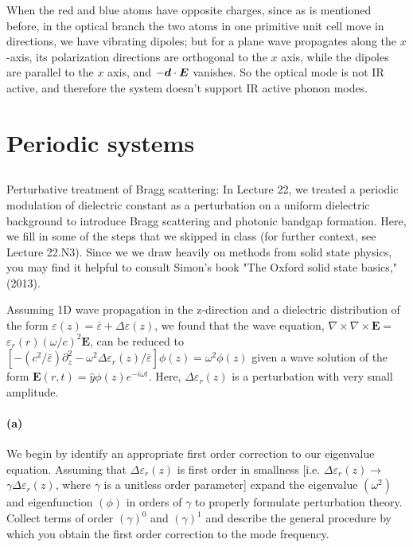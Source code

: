 \documentclass[hyperref, a4paper]{article}
\begin{document}
When the red and blue atoms have opposite charges, 
since as is mentioned before, 
in the optical branch the two atoms in one primitive unit cell move in directions, 
we have vibrating dipoles; 
but for a plane wave propagates along the $x$-axis, 
its polarization directions are orthogonal to the $x$ axis, 
while the dipoles are parallel to the $x$ axis, 
and $- \vb*{d} \cdot \vb*{E}$ vanishes.
So the optical mode is not IR active, 
and therefore the system doesn't support IR active phonon modes.

\section{Periodic systems}

\subsection{}

Perturbative treatment of Bragg scattering: In Lecture 22, we treated a periodic modulation of dielectric constant as a perturbation on a uniform dielectric background to introduce Bragg scattering and photonic bandgap formation. Here, we fill in some of the steps that we skipped in class (for further context, see Lecture 22.N3). Since we we draw heavily on methods from solid state physics, you may find it helpful to consult Simon's book "The Oxford solid state basics," (2013).

Assuming 1D wave propagation in the z-direction and a dielectric distribution of the form $\varepsilon(z)=\bar{\varepsilon}+\Delta \varepsilon(z)$, we found that the wave equation, $\nabla \times \nabla \times \mathbf{E}=$ $\varepsilon_r(r)(\omega / c)^2 \mathbf{E}$, can be reduced to $\left[-\left(c^2 / \bar{\varepsilon}\right) \partial_z^2-\omega^2 \Delta \varepsilon_r(z) / \bar{\varepsilon}\right] \phi(z)=\omega^2 \phi(z)$ given a
wave solution of the form $\mathbf{E}(r, t)=\hat{y} \phi(z) e^{-i \omega t}$. Here, $\Delta \varepsilon_r(z)$ is a perturbation with very small amplitude.

\paragraph*{(a)} We begin by identify an appropriate first order correction to our eigenvalue equation. Assuming that $\Delta \varepsilon_r(z)$ is first order in smallness [i.e. $\Delta \varepsilon_r(z) \rightarrow$ $\gamma \Delta \varepsilon_r(z)$, where $\gamma$ is a unitless order parameter] expand the eigenvalue $\left(\omega^2\right)$ and eigenfunction $(\phi)$ in orders of $\gamma$ to properly formulate perturbation theory. Collect terms of order $(\gamma)^0$ and $(\gamma)^1$ and describe the general procedure by which you obtain the first order correction to the mode frequency.
\end{document}

